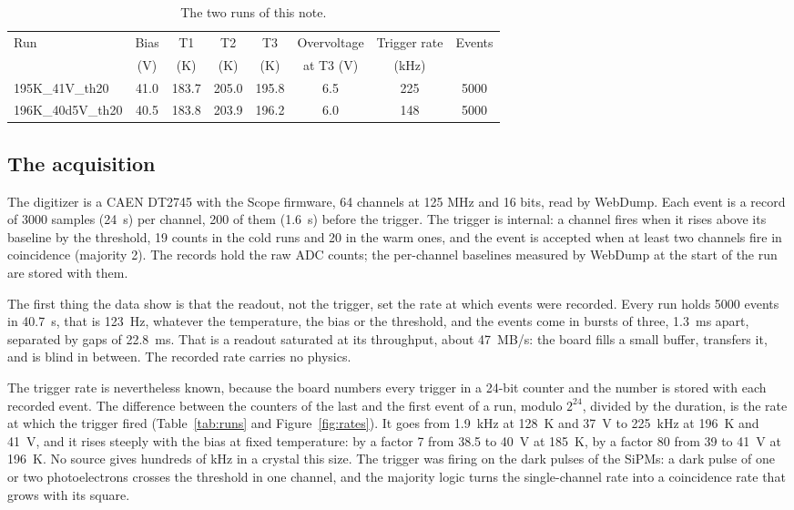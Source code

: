 \documentclass[11pt]{article}
\newcommand{\us}{\textmu s\xspace}
\begin{document}
\begin{table}[h]
\centering
\begin{tabular}{l c c c c c c c}
\toprule
Run & Bias & T1 & T2 & T3 & Overvoltage & Trigger rate & Events \\
 & (V) & (K) & (K) & (K) & at T3 (V) & (kHz) & \\
\midrule
195K\_41V\_th20   & 41.0 & 183.7 & 205.0 & 195.8 & 6.5 & 225 & 5000 \\
196K\_40d5V\_th20 & 40.5 & 183.8 & 203.9 & 196.2 & 6.0 & 148 & 5000 \\
\bottomrule
\end{tabular}
\caption{The two runs of this note.}
\end{table}

\subsection{The acquisition}
\label{sec:daq}

The digitizer is a CAEN DT2745 with the Scope firmware, 64 channels at 125
MHz and 16 bits, read by WebDump. Each event is a record of 3000 samples
(24~\us) per channel, 200 of them (1.6~\us) before the trigger. The
trigger is internal: a channel fires when it rises above its baseline by
the threshold, 19 counts in the cold runs and 20 in the warm ones, and the
event is accepted when at least two channels fire in coincidence (majority
2). The records hold the raw ADC counts; the per-channel baselines measured
by WebDump at the start of the run are stored with them.

The first thing the data show is that the readout, not the trigger, set
the rate at which events were recorded. Every run holds 5000 events in
40.7~s, that is 123~Hz, whatever the temperature, the bias or the
threshold, and the events come in bursts of three, 1.3~ms apart, separated
by gaps of 22.8~ms. That is a readout saturated at its throughput, about
47~MB/s: the board fills a small buffer, transfers it, and is blind in
between. The recorded rate carries no physics.

The trigger rate is nevertheless known, because the board numbers every
trigger in a 24-bit counter and the number is stored with each recorded
event. The difference between the counters of the last and the first event
of a run, modulo $2^{24}$, divided by the duration, is the rate at which the
trigger fired (Table~\ref{tab:runs} and Figure~\ref{fig:rates}). It goes
from 1.9~kHz at 128~K and 37~V to 225~kHz at 196~K and 41~V, and it rises
steeply with the bias at fixed temperature: by a factor 7 from 38.5 to
40~V at 185~K, by a factor 80 from 39 to 41~V at 196~K. No source gives
hundreds of kHz in a crystal this size. The trigger was firing on the dark
pulses of the SiPMs: a dark pulse of one or two photoelectrons crosses the
threshold in one channel, and the majority logic turns the single-channel
rate into a coincidence rate that grows with its square.
\end{document}
